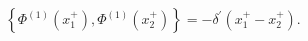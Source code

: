 \begin{equation*}
\left\{ \Phi ^{\left( 1\right) }(x_{1}^{+}),\Phi ^{\left( 1\right)
}(x_{2}^{+})\right\} =-\delta ^{\prime }(x_{1}^{+}-x_{2}^{+}).
\end{equation*}


